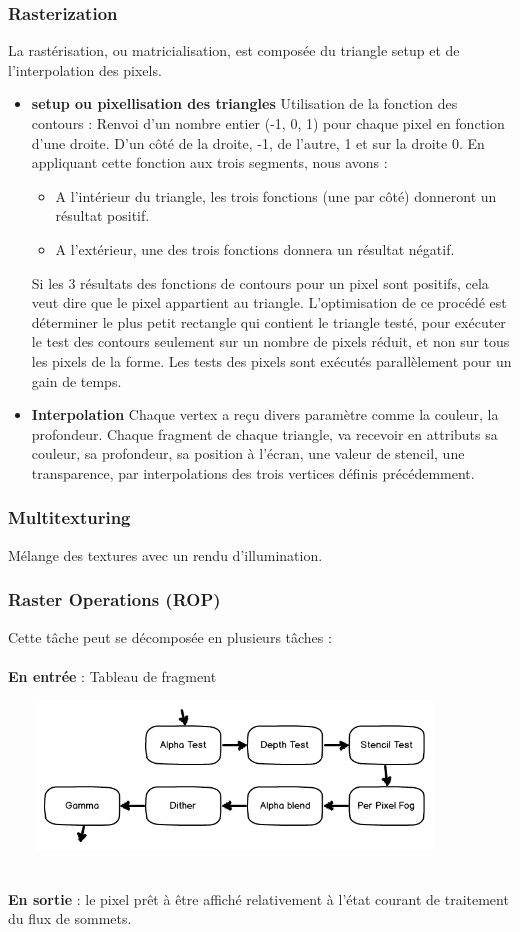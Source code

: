 \subsubsection{Rasterization}
La rastérisation, ou matricialisation, est composée du triangle setup et de l’interpolation des pixels.
\begin{itemize}
  \item{\textbf{setup ou pixellisation des triangles}} 
Utilisation de la fonction des contours : Renvoi d’un nombre entier (-1, 0, 1) pour chaque pixel en fonction d’une droite. D’un côté de la droite, -1, de l’autre, 1 et sur la droite 0.
En appliquant cette fonction aux trois segments, nous avons :
\begin{itemize}
	\item A l'intérieur du triangle, les trois fonctions (une par côté) donneront un résultat positif.
	\item A l'extérieur, une des trois fonctions donnera un résultat négatif.
\end{itemize}
Si les 3 résultats des fonctions de contours pour un pixel sont positifs, cela veut dire que le pixel appartient au triangle.
L’optimisation de ce procédé est déterminer le plus petit rectangle qui contient le triangle testé, pour exécuter le test des contours seulement sur un nombre de pixels réduit, et non sur tous les pixels de la forme.
Les tests des pixels sont exécutés parallèlement pour un gain de temps.
\item{\textbf{Interpolation}}
Chaque vertex a reçu divers paramètre comme la couleur, la profondeur. Chaque fragment  de chaque triangle, va recevoir en attributs sa couleur, sa profondeur, sa position à l’écran, une valeur de stencil, une transparence, par interpolations des trois vertices définis précédemment.
\end{itemize}
\subsubsection{Multitexturing}
Mélange des textures avec un rendu d’illumination.

\subsubsection{Raster Operations (ROP)}
Cette tâche peut se décomposée en plusieurs tâches :
\\\\
\textbf{En entrée} : Tableau de fragment
\begin{center}
\includegraphics[width=12cm,height=40mm]{leo/images/rasterOp.png}
\end{center}
\textbf{\\En sortie} : le pixel prêt à être affiché relativement à l'état courant de traitement du flux de sommets.
\\

